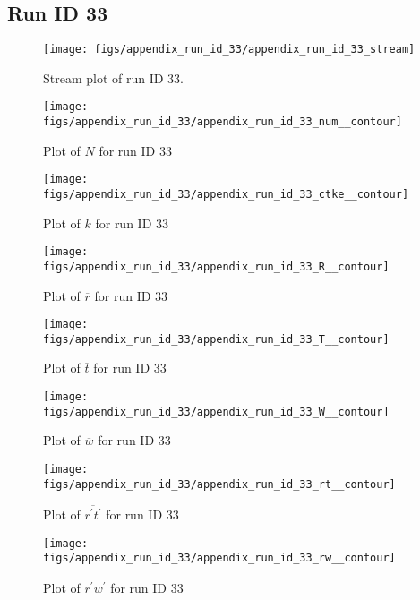 \subsection{Run ID 33}
\begin{figure}[H]
\centering
\texttt{[image: figs/appendix\_run\_id\_33/appendix\_run\_id\_33\_stream]}
\caption{Stream plot of run ID 33.}
\label{fig:appendix_run_id_33_stream}
\end{figure}


\begin{figure}[H]
\centering
\texttt{[image: figs/appendix\_run\_id\_33/appendix\_run\_id\_33\_num\_\_contour]}
\caption{Plot of $N$ for run ID 33}
\label{fig:appendix_run_id_33_num__contour}
\end{figure}


\begin{figure}[H]
\centering
\texttt{[image: figs/appendix\_run\_id\_33/appendix\_run\_id\_33\_ctke\_\_contour]}
\caption{Plot of $k$ for run ID 33}
\label{fig:appendix_run_id_33_ctke__contour}
\end{figure}


\begin{figure}[H]
\centering
\texttt{[image: figs/appendix\_run\_id\_33/appendix\_run\_id\_33\_R\_\_contour]}
\caption{Plot of $\overline{r}$ for run ID 33}
\label{fig:appendix_run_id_33_R__contour}
\end{figure}


\begin{figure}[H]
\centering
\texttt{[image: figs/appendix\_run\_id\_33/appendix\_run\_id\_33\_T\_\_contour]}
\caption{Plot of $\overline{t}$ for run ID 33}
\label{fig:appendix_run_id_33_T__contour}
\end{figure}


\begin{figure}[H]
\centering
\texttt{[image: figs/appendix\_run\_id\_33/appendix\_run\_id\_33\_W\_\_contour]}
\caption{Plot of $\overline{w}$ for run ID 33}
\label{fig:appendix_run_id_33_W__contour}
\end{figure}


\begin{figure}[H]
\centering
\texttt{[image: figs/appendix\_run\_id\_33/appendix\_run\_id\_33\_rt\_\_contour]}
\caption{Plot of $\overline{r^\prime t^\prime}$ for run ID 33}
\label{fig:appendix_run_id_33_rt__contour}
\end{figure}


\begin{figure}[H]
\centering
\texttt{[image: figs/appendix\_run\_id\_33/appendix\_run\_id\_33\_rw\_\_contour]}
\caption{Plot of $\overline{r^\prime w^\prime}$ for run ID 33}
\label{fig:appendix_run_id_33_rw__contour}
\end{figure}


